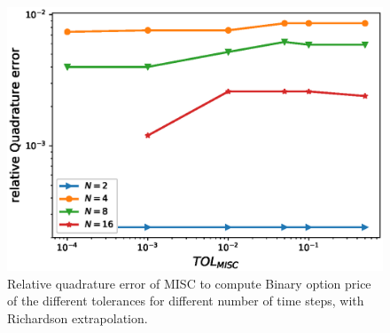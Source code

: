 \documentclass[11pt]{article}
\begin{document}
	\begin{figure}[h!]
	\centering
	\includegraphics[width=0.7\linewidth]{./figures/Binary_MISC_quadrature_error/relative_quad_error_wrt_MISC_TOL_with_rich}
	
	
	\caption{Relative quadrature error of MISC to compute Binary option price of the different tolerances for different number of time steps, with Richardson extrapolation.}
	\label{fig:Quadrature_error_with_rich_binary}
\end{figure}
\end{document}
